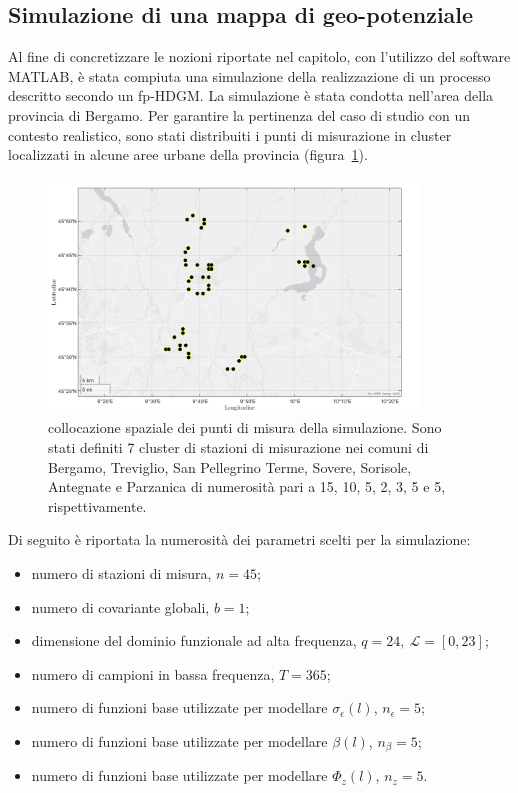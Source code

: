 \subsection[Simulazione di una mappa di geo-potenziale]{Simulazione di una mappa di geo-potenziale}
Al fine di concretizzare le nozioni riportate nel capitolo, con l'utilizzo del software MATLAB, è stata compiuta una simulazione della realizzazione di un processo descritto secondo un fp-HDGM. La simulazione è stata condotta nell'area della provincia di Bergamo. Per garantire la pertinenza del caso di studio con un contesto realistico, sono stati distribuiti i punti di misurazione in cluster localizzati in alcune aree urbane della provincia (figura~\ref{mappa_stazioni_simulate}). 
\begin{figure}[htpb]
	\centering
	\includegraphics[height=235px]{Immagini/2. Nuovo modello/Mappa stazioni simulate_png}
	\caption[Collocazione spaziale dei punti di misura della simulazione.] {collocazione spaziale dei punti di misura della simulazione. Sono stati definiti 7 cluster di stazioni di misurazione nei comuni di Bergamo, Treviglio, San Pellegrino Terme, Sovere, Sorisole, Antegnate e Parzanica di numerosità pari a \num{15}, \num{10}, \num{5}, \num{2}, \num{3}, \num{5} e \num{5}, rispettivamente.}
	\label{mappa_stazioni_simulate}
\end{figure}
Di seguito è riportata la numerosità dei parametri scelti per la simulazione:
\begin{itemize}
	\item numero di stazioni di misura, $n=45$;
	\item numero di covariante globali, $b=1$;                               
	\item dimensione del dominio funzionale ad alta frequenza, $q=24,\ \mathcal{L}=[0, 23]$;
	\item numero di campioni in bassa frequenza, $T=365$;
	\item numero di funzioni base utilizzate per modellare  $\sigma_\epsilon (l)$,  $n_\epsilon =5$;
	\item numero di funzioni base utilizzate per modellare $\beta(l)$, $n_\beta=5$;
	\item numero di funzioni base utilizzate per modellare $\Phi_z(l)$, $n_z=5$.
\end{itemize}

